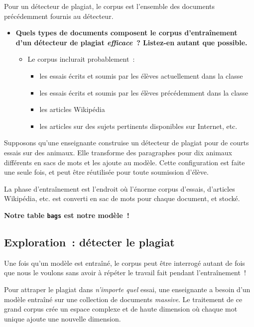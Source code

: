 \documentclass[12pt,a4paper]{article}
\begin{document}
\begin{thinkbox}
  Pour un détecteur de plagiat, le corpus est l'ensemble des documents précédemment fournis au détecteur.

  \begin{itemize}
    \item \textbf{Quels types de documents composent le corpus d'entraînement d'un détecteur de plagiat \emph{efficace}~? Listez-en autant que possible.}
    \begin{itemize}
      \item Le corpus inclurait probablement~:
      \begin{itemize}
        \item les essais écrits et soumis par les élèves actuellement dans la classe
        \item les essais écrits et soumis par les élèves précédemment dans la classe
        \item les articles Wikipédia
        \item les articles sur des sujets pertinents disponibles sur Internet, etc.
      \end{itemize}
    \end{itemize}
  \end{itemize}
\end{thinkbox}

\begin{keypointbox}
  Supposons qu'une enseignante construise un détecteur de plagiat pour de courts essais sur des animaux. Elle transforme des paragraphes pour dix animaux différents en sacs de mots et les ajoute au modèle. Cette configuration est faite une seule fois, et peut être réutilisée pour toute soumission d'élève.

  La phase d'entraînement est l'endroit où l'énorme corpus d'essais, d'articles Wikipédia, etc. est converti en sac de mots pour chaque document, et stocké.

  \textbf{Notre table \texttt{bags} est notre modèle~!}
\end{keypointbox}

\subsection{Exploration~: détecter le plagiat}

\begin{keypointbox}
  Une fois qu'un modèle est entraîné, le corpus peut être interrogé autant de fois que nous le voulons sans avoir à répéter le travail fait pendant l'entraînement~!

  Pour attraper le plagiat dans \emph{n'importe quel} essai, une enseignante a besoin d'un modèle entraîné sur une collection de documents \emph{massive}. Le traitement de ce grand corpus crée un espace complexe et de haute dimension où chaque mot unique ajoute une nouvelle dimension.
\end{keypointbox}
\end{document}
